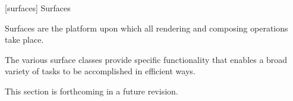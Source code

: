 
 [surfaces] {Surfaces}

\pnum
Surfaces are the platform upon which all rendering and composing operations take place.

\pnum
The various surface classes provide specific functionality that enables a broad variety of tasks to be accomplished in efficient ways.

\pnum
This section is forthcoming in a future revision.

\addtocounter{SectionDepthBase}{1}













\addtocounter{SectionDepthBase}{-1}
